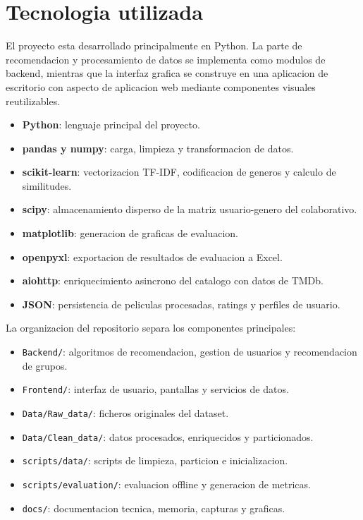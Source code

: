 \documentclass[12pt,a4paper]{article}
\begin{document}
\section{Tecnologia utilizada}

El proyecto esta desarrollado principalmente en Python. La parte de recomendacion y procesamiento de datos se implementa como modulos de backend, mientras que la interfaz grafica se construye en una aplicacion de escritorio con aspecto de aplicacion web mediante componentes visuales reutilizables.

\begin{itemize}[leftmargin=*]
\item \textbf{Python}: lenguaje principal del proyecto.
\item \textbf{pandas y numpy}: carga, limpieza y transformacion de datos.
\item \textbf{scikit-learn}: vectorizacion TF-IDF, codificacion de generos y calculo de similitudes.
\item \textbf{scipy}: almacenamiento disperso de la matriz usuario-genero del colaborativo.
\item \textbf{matplotlib}: generacion de graficas de evaluacion.
\item \textbf{openpyxl}: exportacion de resultados de evaluacion a Excel.
\item \textbf{aiohttp}: enriquecimiento asincrono del catalogo con datos de TMDb.
\item \textbf{JSON}: persistencia de peliculas procesadas, ratings y perfiles de usuario.
\end{itemize}

La organizacion del repositorio separa los componentes principales:

\begin{itemize}[leftmargin=*]
\item \texttt{Backend/}: algoritmos de recomendacion, gestion de usuarios y recomendacion de grupos.
\item \texttt{Frontend/}: interfaz de usuario, pantallas y servicios de datos.
\item \texttt{Data/Raw\_data/}: ficheros originales del dataset.
\item \texttt{Data/Clean\_data/}: datos procesados, enriquecidos y particionados.
\item \texttt{scripts/data/}: scripts de limpieza, particion e inicializacion.
\item \texttt{scripts/evaluation/}: evaluacion offline y generacion de metricas.
\item \texttt{docs/}: documentacion tecnica, memoria, capturas y graficas.
\end{itemize}
\end{document}
